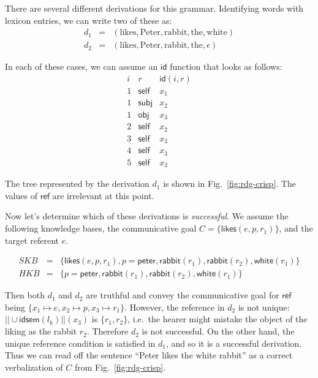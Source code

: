 \documentclass[11pt,a4]{article}
\newcommand{\self}{\mathsf{self}}
\newcommand{\refr}{\mathsf{ref}}
\newcommand{\id}{\mathsf{id}}
\newcommand{\idsem}{\mathsf{idsem}}
\theoremstyle{plain}
\theoremstyle{definition}
\begin{document}
There are several different derivations for this grammar. Identifying
words with lexicon entries, we can write two of these as:
$$
\begin{array}{lll}
  d_1 &= &(\mathrm{likes}, \mathrm{Peter}, \mathrm{rabbit},
  \mathrm{the}, \mathrm{white}) \\
  d_2 &= &(\mathrm{likes}, \mathrm{Peter}, \mathrm{rabbit},
  \mathrm{the}, \epsilon) 
\end{array}
$$

In each of these cases, we can assume an $\id$ function that looks as
follows:
$$\begin{array}{ll|l}
i&r&\id(i,r) \\\hline
1&\self&x_1 \\
1&\mathsf{subj}&x_2 \\
1&\mathsf{obj}&x_3 \\
2&\self&x_2 \\
3&\self&x_3 \\
4&\self&x_3 \\
5&\self&x_3
\end{array}
$$

The tree represented by the derivation $d_1$ is shown in
Fig.~\ref{fig:rdg-crisp}.  The values of $\refr$ are irrelevant at
this point.

Now let's determine which of these derivations is
\emph{successful}. We assume the following knowledge bases, the
communicative goal $C=\{\mathsf{likes}(e,p,r_1)\}$, and the target
referent $e$.

$$\begin{array}{lll}
  SKB &=
  &\{\mathsf{likes}(e,p,r_1), p = \mathsf{peter}, \mathsf{rabbit}(r_1),
  \mathsf{rabbit}(r_2), \mathsf{white}(r_1)\} \\
  HKB &= &\{p = \mathsf{peter}, \mathsf{rabbit}(r_1),
  \mathsf{rabbit}(r_2), \mathsf{white}(r_1)\} 
\end{array}
$$

Then both $d_1$ and $d_2$ are truthful and convey the communicative
goal for $\refr$ being $\{x_1 \mapsto e, x_2 \mapsto p, x_3 \mapsto
r_1\}$. However, the reference in $d_2$ is not unique: $||\cup
\idsem(l_k)||(x_3)$ is $\{r_1,r_2\}$, i.e.\ the hearer might mistake
the object of the liking as the rabbit $r_2$. Therefore $d_2$ is not
successful. On the other hand, the unique reference condition is
satisfied in $d_1$, and so it is a successful derivation. Thus we can
read off the sentence ``Peter likes the white rabbit'' as a correct
verbalization of $C$ from Fig.~\ref{fig:rdg-crisp}.
\end{document}
